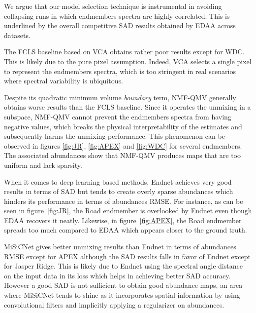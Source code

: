 
We argue that our model selection technique is instrumental in avoiding
collapsing runs in which endmembers spectra are highly correlated.
This is underlined by the overall competitive SAD results obtained by EDAA
across datasets.

The FCLS baseline based on VCA obtains rather poor results except for WDC.
This is likely due to the pure pixel assumption. Indeed, VCA selects a single
pixel to represent the endmembers spectra, which is too stringent in real
scenarios where spectral variability is ubiquitous.

Despite its quadratic minimum volume \emph{boundary} term, NMF-QMV generally
obtains worse results than the FCLS baseline.
Since it operates the unmixing in a subspace, NMF-QMV cannot prevent the endmembers spectra from having negative
values, which breaks the physical interpretability of the estimates and
subsequently harms the unmixing performance.
This phenomenon can be observed in figures
\ref{fig:JR},
\ref{fig:APEX} and \ref{fig:WDC} for
several endmembers.
The associated abundances show that NMF-QMV produces maps that are too uniform and lack sparsity.


When it comes to deep learning based methods, Endnet achieves very good results in terms of SAD but tends to
create overly sparse abundances which hinders its performance in terms of
abundances RMSE.
For instance, as can be seen in figure~\ref{fig:JR}, the
Road endmember is overlooked by Endnet even though EDAA recovers it neatly.
Likewise, in figure~\ref{fig:APEX}, the Road endmember spreads too much
compared to EDAA which appears closer to the ground truth.

MiSiCNet gives better unmixing results than Endnet in terms of abundances RMSE
except for APEX although the SAD results falls in favor of Endnet except for
Jasper Ridge.
This is likely due to Endnet using the spectral angle distance on
the input data in its loss which helps in achieving better SAD accuracy.
However a good SAD is not sufficient to obtain good abundance maps, an area
where MiSiCNet tends to shine as it incorporates spatial information by using
convolutional filters and implicitly applying a regularizer on abundances.


